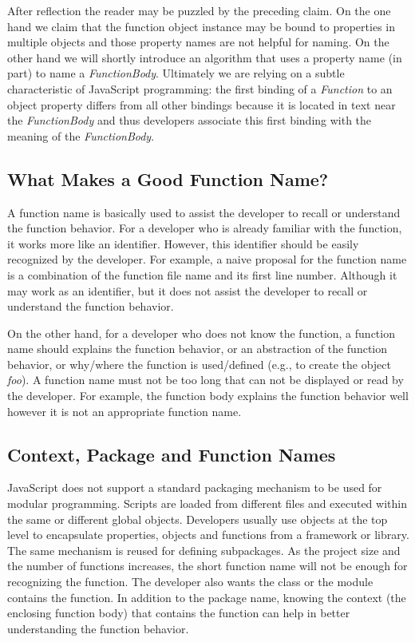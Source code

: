 \documentclass[10pt, preprint]{sigplanconf}
\begin{document}
After reflection the reader may be puzzled by the preceding claim. On the one hand we claim that the function object instance may be bound to properties in multiple objects and those property names are not helpful for naming. On the other hand we will shortly introduce an algorithm that uses a property name (in part) to name a {\textit{FunctionBody}}. Ultimately we are relying on a subtle characteristic of JavaScript programming: the first binding of a {\textit{Function}}  to an object property differs from all other bindings because it is located in text near the {\textit{FunctionBody}} and thus developers associate this first binding with the meaning of the {\textit{FunctionBody}}. 

\subsection{What Makes a Good Function Name?}
A function name is basically used to assist the developer to recall or understand the function behavior. For a developer who is already familiar with the function, it works more like an identifier. However, this identifier should be easily recognized by the developer. For example, a naive proposal for the function name is a combination of the function file name and its first line number. Although it may work as an identifier, but it does not assist the developer to recall or understand the function behavior.

 On the other hand, for a developer who does not know the function, a function name should explains the function behavior, or an abstraction of the function behavior, or why/where the function is used/defined (e.g., to create the object \textit{foo}). A function name must not be too long that can not be displayed or read by the developer. For example, the function body explains the function behavior well however it is not an appropriate function name.

\subsection{Context, Package and Function Names}
JavaScript does not support a standard packaging mechanism to be used for modular programming. Scripts are loaded from different files and executed within the same or different global objects. Developers usually use objects at the top level to encapsulate properties, objects and functions from a framework or library. The same mechanism is reused for defining subpackages. As the project size and the number of functions increases, the short function name will not be enough for recognizing the function. The developer also wants the class or the module contains the function. In addition to the package name, knowing the context (the enclosing function body) that contains the function can help in better understanding the function behavior.
\end{document}
